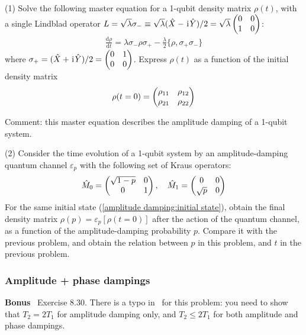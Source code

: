 (1) Solve the following master equation for a 1-qubit density matrix $\rho(t)$, with a single Lindblad operator $L=\sqrt{\lambda}\sigma_-\equiv\sqrt{\lambda}(\hat X-\hspace{1pt}\mathrm{i}\hspace{1pt}\hat Y)/2=\sqrt{\lambda}\begin{pmatrix}0&0\\1&0\end{pmatrix}$:
\begin{align}
\frac{\text{d}\rho}{\text{d}t}=\lambda\sigma_-\rho\sigma_+-\frac\lambda2\{\rho,\sigma_+\sigma_-\}
\end{align}
where $\sigma_+=(\hat X+\hspace{1pt}\mathrm{i}\hspace{1pt}\hat Y)/2=\begin{pmatrix}0&1\\0&0\end{pmatrix}$. Express $\rho(t)$ as a function of the initial density matrix
\begin{align}\label{amplitude damping:initial state}
\rho(t=0)=\begin{pmatrix}\rho_{11}&\rho_{12}\\ \rho_{21}&\rho_{22}\end{pmatrix}
\end{align}

Comment: this master equation describes the amplitude damping of a 1-qubit system. 

(2) Consider the time evolution of a 1-qubit system by an amplitude-damping quantum channel $\varepsilon_p$ with the following set of Kraus operators:
\begin{align}
\hat M_0=\begin{pmatrix}\sqrt{1-p}&0\\0&1\end{pmatrix},~~~\hat M_1=\begin{pmatrix}0&0\\ \sqrt p&0\end{pmatrix}
\end{align}
For the same initial state (\ref{amplitude damping:initial state}), obtain the final density matrix $\rho(p)=\varepsilon_p[\rho(t=0)]$ after the action of the quantum channel, as a function of the amplitude-damping probability $p$. Compare it with the previous problem, and obtain the relation between $p$ in this problem, and $t$ in the previous problem. 

\subsubsection{Amplitude + phase dampings}

\textbf{Bonus} \nielsen~Exercise 8.30. There is a typo in \nielsen~for this problem: you need to show that $T_2=2T_1$ for amplitude damping only, and $T_2\leq 2T_1$ for both amplitude and phase dampings. 
